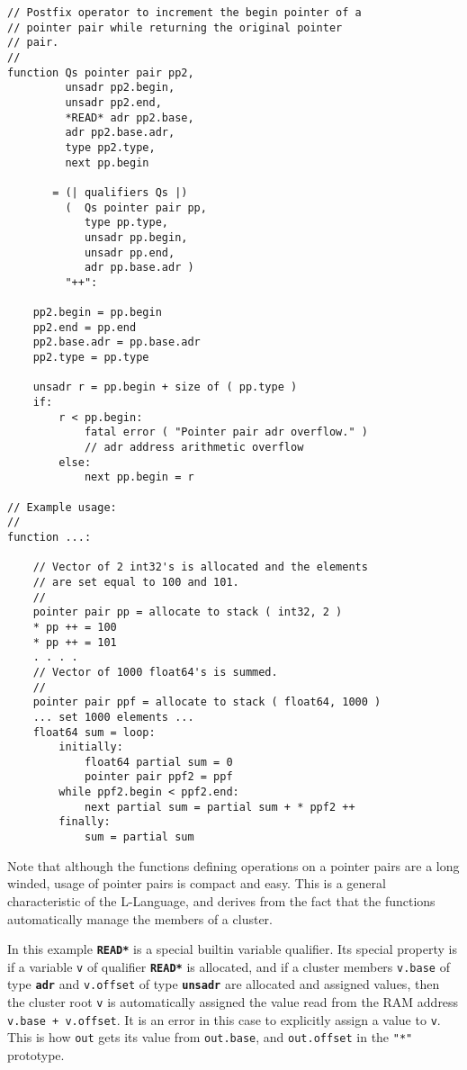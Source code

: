 \documentclass[12pt]{article}
\newcommand{\TT}[1]{{\tt \bfseries #1}}
\newenvironment{indpar}[1][0.3in]%
	{\begin{list}{}%
		     {\setlength{\itemsep}{0in}%
		      \setlength{\topsep}{0in}%
		      \setlength{\parsep}{1ex}%
		      \setlength{\labelwidth}{#1}%
		      \setlength{\leftmargin}{#1}%
		      \addtolength{\leftmargin}{\labelsep}}%
	 \item}%
	{\end{list}}
\begin{document}
\begin{indpar}
\begin{verbatim}
// Postfix operator to increment the begin pointer of a
// pointer pair while returning the original pointer
// pair.
//
function Qs pointer pair pp2,
         unsadr pp2.begin,
         unsadr pp2.end,
         *READ* adr pp2.base,
         adr pp2.base.adr,
         type pp2.type,
         next pp.begin

       = (| qualifiers Qs |)
         (  Qs pointer pair pp,
            type pp.type,
            unsadr pp.begin,
            unsadr pp.end,
            adr pp.base.adr )
         "++":

    pp2.begin = pp.begin
    pp2.end = pp.end
    pp2.base.adr = pp.base.adr
    pp2.type = pp.type

    unsadr r = pp.begin + size of ( pp.type )
    if:
        r < pp.begin:
            fatal error ( "Pointer pair adr overflow." )
            // adr address arithmetic overflow
        else:
            next pp.begin = r

// Example usage:
//
function ...:

    // Vector of 2 int32's is allocated and the elements
    // are set equal to 100 and 101.
    //
    pointer pair pp = allocate to stack ( int32, 2 )
    * pp ++ = 100
    * pp ++ = 101
    . . . .
    // Vector of 1000 float64's is summed.
    //
    pointer pair ppf = allocate to stack ( float64, 1000 )
    ... set 1000 elements ...
    float64 sum = loop:
        initially:
            float64 partial sum = 0
            pointer pair ppf2 = ppf
        while ppf2.begin < ppf2.end:
            next partial sum = partial sum + * ppf2 ++
        finally:
            sum = partial sum
\end{verbatim}\end{indpar}\label{NEXT-CLUSTER-BASE-EXAMPLE}

Note that although the functions defining operations on a pointer pairs
are a long winded, usage of pointer pairs is compact and easy.
This is a general characteristic of the L-Language, and derives
from the fact that the functions automatically manage the members
of a cluster.

In this example \TT{*READ*}\label{READ} is a special builtin variable qualifier.
Its special property is if a variable
{\tt v} of qualifier \TT{*READ*} is allocated,
and if a cluster members  {\tt v.base} of type \TT{adr}
and {\tt v.offset} of type \TT{unsadr}
are allocated and assigned values, then
the cluster root {\tt v} is automatically
assigned the value read from the RAM address {\tt v.base + v.offset}.
It is an error in this case to explicitly assign a value to {\tt v}.
This is how {\tt out} gets its value from
{\tt out.base}, and {\tt out.offset} in the {\tt "*"} prototype.
\end{document}
